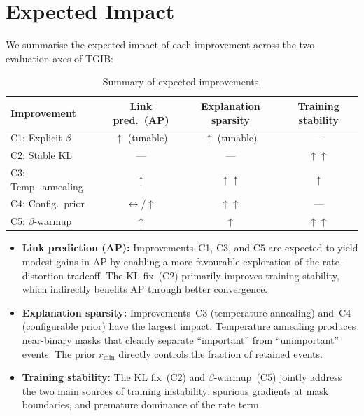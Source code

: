 \documentclass[11pt,a4paper]{article}
\begin{document}
\section{Expected Impact}
\label{sec:impact}

We summarise the expected impact of each improvement across the two
evaluation axes of TGIB:

\begin{table}[ht]
\centering
\caption{Summary of expected improvements.}
\label{tab:impact}
\begin{tabular}{@{}lccc@{}}
\toprule
Improvement & Link pred.\ (AP) & Explanation sparsity & Training stability \\
\midrule
C1: Explicit $\beta$ & $\uparrow$ (tunable) & $\uparrow$ (tunable) & --- \\
C2: Stable KL & --- & --- & $\uparrow\uparrow$ \\
C3: Temp.\ annealing & $\uparrow$ & $\uparrow\uparrow$ & $\uparrow$ \\
C4: Config.\ prior & $\leftrightarrow$/$\uparrow$ & $\uparrow\uparrow$ & --- \\
C5: $\beta$-warmup & $\uparrow$ & $\uparrow$ & $\uparrow\uparrow$ \\
\bottomrule
\end{tabular}
\end{table}

\begin{itemize}[leftmargin=*,itemsep=2pt]
  \item \textbf{Link prediction (AP):} Improvements~C1, C3, and C5
        are expected to yield modest gains in AP by enabling a more
        favourable exploration of the rate--distortion tradeoff. The
        KL fix~(C2) primarily improves training stability, which
        indirectly benefits AP through better convergence.

  \item \textbf{Explanation sparsity:} Improvements~C3 (temperature
        annealing) and~C4 (configurable prior) have the largest impact.
        Temperature annealing produces near-binary masks that cleanly
        separate ``important'' from ``unimportant'' events. The prior
        $r_{\min}$ directly controls the fraction of retained events.

  \item \textbf{Training stability:} The KL fix~(C2) and
        $\beta$-warmup~(C5) jointly address the two main sources of
        training instability: spurious gradients at mask boundaries,
        and premature dominance of the rate term.
\end{itemize}
\end{document}
